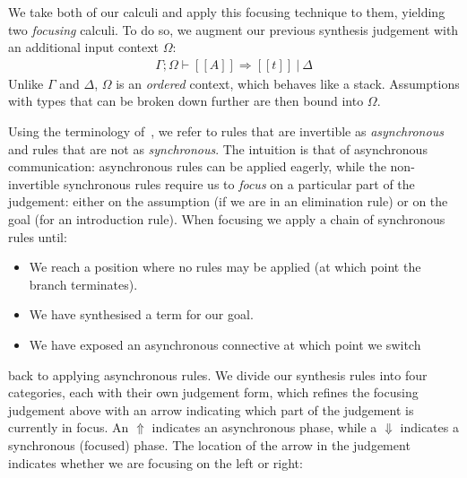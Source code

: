 We take both of our calculi and apply this focusing technique to them,
yielding two \textit{focusing} calculi. To do so, we augment our previous
synthesis judgement with an additional input context $\Omega$:
\begin{align*}
\Gamma ; \Omega \vdash [[ A ]] \Rightarrow [[t ]]\ |\ \Delta
\end{align*}
Unlike $\Gamma$ and $\Delta$, $\Omega$ is an \textit{ordered} context, which
behaves like a stack. Assumptions with types that can be broken down further are
then bound into $\Omega$. 

Using the terminology of~\citet{focusing}, we refer to rules that are invertible
as \textit{asynchronous} and rules that are not as \textit{synchronous}. The
intuition is that of asynchronous communication: asynchronous rules can be
applied eagerly, while the non-invertible synchronous rules require us to
\textit{focus} on a particular part of the judgement: either on the assumption
(if we are in an elimination rule) or on the goal (for an introduction rule).
When focusing we apply a chain of synchronous rules until:
\begin{itemize}
  \item We reach a position where no rules may be applied (at which point the branch terminates).
  \item We have synthesised a term for our goal.
  \item We have exposed an asynchronous connective at which point we switch
\end{itemize}
  back to applying asynchronous rules.
We divide our synthesis rules into four categories, each with their own
judgement form, which refines the focusing judgement above with an arrow
indicating which part of the judgement is currently in focus. An $\Uparrow$
indicates an asynchronous phase, while a $\Downarrow$ indicates a synchronous
(focused) phase. The location of the arrow in the judgement indicates whether we
are focusing on the left or right:
